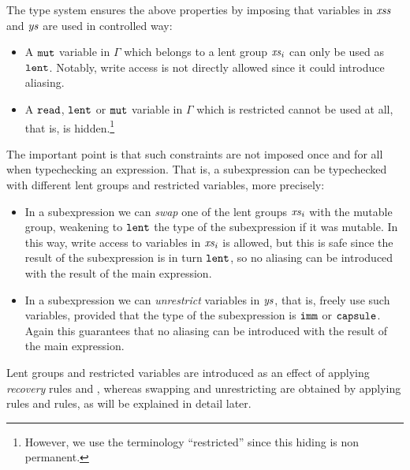 {The type system ensures the above properties by imposing that variables in $\mathit{xss}$ and $\mathit{ys}$ are used in controlled way:
\begin{itemize}
\item A $\texttt{mut}$ variable in $\Gamma$ which belongs to a {lent group} $\mathit{xs}_i$ can only be used as $\texttt{lent}$. Notably, write access is not directly allowed since it could introduce aliasing.
\item A $\texttt{read}$, $\texttt{lent}$ or $\texttt{mut}$ variable in $\Gamma$ which is restricted cannot be used at all, that is, is hidden.\footnote{{However, we use the terminology ``restricted'' since this hiding is non permanent.}}
\end{itemize}
The important point is that such constraints are not imposed once and for all when typechecking an expression. That is, a subexpression can be typechecked with different {lent group}s and restricted variables, more precisely:
\begin{itemize}
\item In a subexpression we can \emph{swap} one of the {lent group}s $\mathit{xs}_i$ with the {mutable group}, weakening to $\texttt{lent}$ the type of the subexpression if it was mutable. 
In this way, write access to variables in $\mathit{xs}_i$ is allowed, but this is safe since the result of the subexpression is in turn $\texttt{lent}$, so no aliasing can be introduced with the result of the main expression. 
\item In a subexpression we can \emph{unrestrict} variables in $\mathit{ys}$, that is, freely use such variables, provided that the type of the subexpression is $\texttt{imm}$ or $\texttt{capsule}$.  Again this guarantees that no aliasing can be introduced with the result of the main expression.
\end{itemize} }

Lent groups and restricted variables are introduced as an effect of applying \emph{recovery} rules  and , whereas swapping and unrestricting are obtained by applying rules  and  rules, as will be explained in detail later. 


